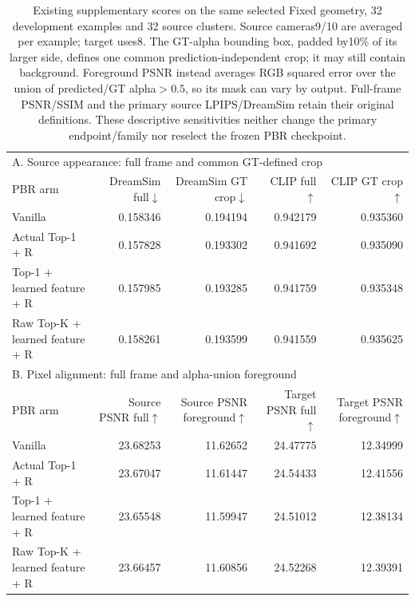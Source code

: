 \begin{table}[t]
\centering\small
\setlength{\tabcolsep}{4pt}
\begin{tabular}{lrrrr}
\toprule
\multicolumn{5}{l}{A. Source appearance: full frame and common GT-defined crop}\\
PBR arm&\shortstack{DreamSim\\full$\downarrow$}&\shortstack{DreamSim\\GT crop$\downarrow$}&\shortstack{CLIP\\full$\uparrow$}&\shortstack{CLIP\\GT crop$\uparrow$}\\
\midrule
Vanilla&0.158346&0.194194&0.942179&0.935360\\
Actual Top-1 + R&0.157828&0.193302&0.941692&0.935090\\
Top-1 + learned feature + R&0.157985&0.193285&0.941759&0.935348\\
Raw Top-K + learned feature + R&0.158261&0.193599&0.941559&0.935625\\
\midrule
\multicolumn{5}{l}{B. Pixel alignment: full frame and alpha-union foreground}\\
PBR arm&\shortstack{Source PSNR\\full$\uparrow$}&\shortstack{Source PSNR\\foreground$\uparrow$}&\shortstack{Target PSNR\\full$\uparrow$}&\shortstack{Target PSNR\\foreground$\uparrow$}\\
\midrule
Vanilla&23.68253&11.62652&24.47775&12.34999\\
Actual Top-1 + R&23.67047&11.61447&24.54433&12.41556\\
Top-1 + learned feature + R&23.65548&11.59947&24.51012&12.38134\\
Raw Top-K + learned feature + R&23.66457&11.60856&24.52268&12.39391\\
\bottomrule
\end{tabular}
\caption{Existing supplementary scores on the same selected Fixed geometry, 32 development examples and 32 source clusters. Source cameras9/10 are averaged per example; target uses8. The GT-alpha bounding box, padded by10\% of its larger side, defines one common prediction-independent crop; it may still contain background. Foreground PSNR instead averages RGB squared error over the union of predicted/GT alpha$>0.5$, so its mask can vary by output. Full-frame PSNR/SSIM and the primary source LPIPS/DreamSim retain their original definitions. These descriptive sensitivities neither change the primary endpoint/family nor reselect the frozen PBR checkpoint.}
\label{tab:dev-fixed-pbr-foreground}
\end{table}
